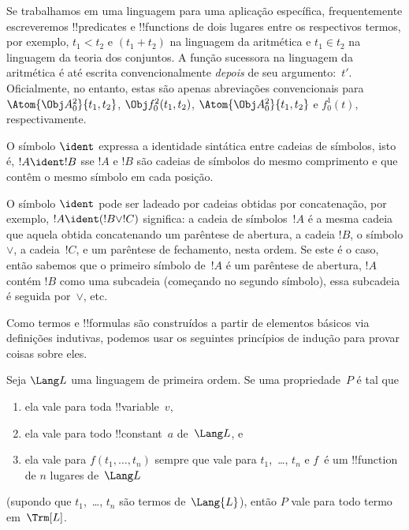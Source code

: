 \documentclass[../../../include/open-logic-section]{subfiles}
\begin{document}
Se trabalhamos em uma linguagem para uma aplicação específica, frequentemente
escreveremos !!{predicate}s e !!{function}s de dois lugares entre os
respectivos termos, por exemplo, $t_1 < t_2$ e $(t_1 + t_2)$ na linguagem
da aritmética e $t_1 \in t_2$ na linguagem da teoria dos conjuntos.  A
função sucessora na linguagem da aritmética é até escrita
convencionalmente \emph{depois} de seu argumento:~$t'$.  Oficialmente, no entanto,
estas são apenas abreviações convencionais para $\Atom{\Obj A^2_0}{t_1, t_2}$,
$\Obj f^2_0(t_1, t_2)$, $\Atom{\Obj A^2_0}{t_1, t_2}$ e $f^1_0(t)$,
respectivamente.

\begin{defn}
O símbolo $\ident$ expressa a identidade sintática entre cadeias de
símbolos, isto é, $!A \ident !B$ sse $!A$ e $!B$ são cadeias de símbolos
do mesmo comprimento e que contêm o mesmo símbolo em cada posição.
\end{defn}

O símbolo $\ident$ pode ser ladeado por cadeias obtidas por
concatenação, por exemplo, $!A \ident (!B \lor !C)$ significa: a cadeia de
símbolos~$!A$ é a mesma cadeia que aquela obtida concatenando
um parêntese de abertura, a cadeia $!B$, o símbolo $\lor$, a
cadeia~$!C$, e um parêntese de fechamento, nesta ordem. Se este é o
caso, então sabemos que o primeiro símbolo de~$!A$ é um parêntese de
abertura, $!A$ contém $!B$ como uma subcadeia (começando no segundo
símbolo), essa subcadeia é seguida por~$\lor$, etc.

Como termos e !!{formula}s são construídos a partir de elementos básicos via definições
indutivas, podemos usar os seguintes princípios de indução para provar
coisas sobre eles.

\begin{lem}
    Seja $\Lang L$ uma linguagem de primeira ordem.
    Se uma propriedade~$P$ é tal que
    \begin{enumerate}
        \item ela vale para toda !!{variable}~$v$,
        \item ela vale para todo !!{constant}~$a$ de~$\Lang L$, e
        \item ela vale para $f(t_1,\dotsc,t_n)$ sempre que vale para
        $t_1$,~\dots, $t_n$ e $f$~é um !!{function} de $n$ lugares
            de~$\Lang L$
    \end{enumerate}
    (supondo que $t_1$,~\dots, $t_n$ são termos de~$\Lang{L}$),
    então $P$ vale para todo termo em~$\Trm[L]$.
\end{lem}
\end{document}
